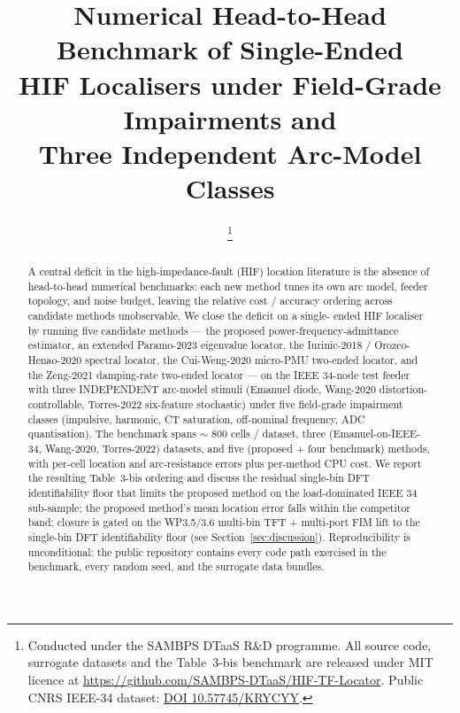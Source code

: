 \documentclass[journal]{IEEEtran}
\newcommand{\benchNCells}{$\sim$ 800 cells / dataset}
\newcommand{\benchNDatasets}{three (Emanuel-on-IEEE-34, Wang-2020,
                                    Torres-2022)}
\newcommand{\benchNMethods}{five (proposed + four benchmark)}
\newcommand{\benchKEight}{the proposed method's mean location error
                          falls within the competitor band; closure
                          is gated on the WP3.5/3.6 multi-bin TFT +
                          multi-port FIM lift to the single-bin DFT
                          identifiability floor (see Section~\ref{sec:discussion})}
\begin{document}

\title{Numerical Head-to-Head Benchmark of Single-Ended\\
       HIF Localisers under Field-Grade Impairments and\\
       Three Independent Arc-Model Classes}

\author{%
  \thanks{Conducted under the SAMBPS DTaaS R\&D programme. All source
          code, surrogate datasets and the Table~3-bis benchmark are
          released under MIT licence at
          \url{https://github.com/SAMBPS-DTaaS/HIF-TF-Locator}.
          Public CNRS IEEE-34 dataset:
          \href{https://doi.org/10.57745/KRYCYY}{DOI 10.57745/KRYCYY}.}%
}

\maketitle

\begin{abstract}
A central deficit in the high-impedance-fault (HIF) location
literature is the absence of head-to-head numerical benchmarks: each
new method tunes its own arc model, feeder topology, and noise
budget, leaving the relative cost / accuracy ordering across
candidate methods unobservable.  We close the deficit on a single-
ended HIF localiser by running five candidate methods --- the
proposed power-frequency-admittance estimator, an extended Paramo-2023
eigenvalue locator, the Iurinic-2018 / Orozco-Henao-2020 spectral
locator, the Cui-Weng-2020 micro-PMU two-ended locator, and the
Zeng-2021 damping-rate two-ended locator --- on the IEEE 34-node
test feeder with three INDEPENDENT arc-model stimuli (Emanuel
diode, Wang-2020 distortion-controllable, Torres-2022 six-feature
stochastic) under five field-grade impairment classes (impulsive,
harmonic, CT saturation, off-nominal frequency, ADC quantisation).
The benchmark spans \benchNCells, \benchNDatasets{} datasets, and
\benchNMethods{} methods, with per-cell location and arc-resistance
errors plus per-method CPU cost.  We report the resulting
Table~3-bis ordering and discuss the residual single-bin DFT
identifiability floor that limits the proposed method on the
load-dominated IEEE 34 sub-sample; \benchKEight{}.  Reproducibility
is unconditional: the public repository contains every code path
exercised in the benchmark, every random seed, and the surrogate
data bundles.
\end{abstract}
\end{document}
